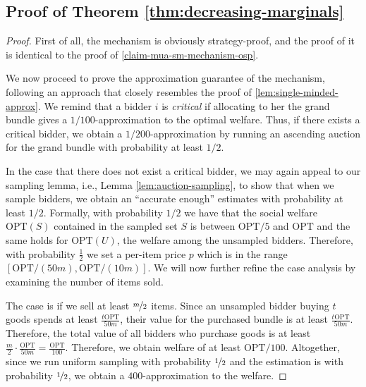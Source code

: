 \subsection{Proof of Theorem \ref{thm:decreasing-marginals}}
\label{subsec::proof--dec-mua}
\begin{proof}
First of all, the mechanism is obviously strategy-proof, and the proof of it is identical to the proof of \cref{claim-mua-sm-mechanism-osp}. 

We now proceed to prove the approximation guarantee of the mechanism, following an approach that closely resembles the proof of \cref{lem:single-minded-approx}. We remind that a bidder $i$ is \emph{critical} if allocating to her the grand bundle
gives a $1/100$-approximation to the optimal welfare. 
Thus, if there exists a critical bidder, we obtain a $1/200$-approximation by running an ascending auction for the grand bundle with probability at least $1/2$.

    In the case that there does not exist a critical bidder, we may again appeal to our sampling lemma, i.e., Lemma \ref{lem:auction-sampling}, to show that when we sample bidders, we obtain an ``accurate enough'' estimates with probability at least $1/2$. Formally, with probability $1/2$ we have that the social welfare $\text{OPT}(S)$ contained in the sampled set $S$ is between $\text{OPT}/5$ and $\text{OPT}$  and the same holds for $\text{OPT}(U)$, the welfare among the unsampled bidders. 
    Therefore, with probability $\frac 1 2 $ we set a per-item price $p$ which is in the range $[\text{OPT}/(50m), \text{OPT}/(10m)]$. We will now further refine the case analysis by examining the number of items sold.
    
    The  case is if we sell at least $\nicefrac m 2$ items. 
      Since an unsampled bidder buying $t$ goods spends at least $\frac{t\text{OPT}}{50m}$, their value for the purchased bundle is at least $\frac{t\text{OPT}}{50m}$. Therefore, the total value of all bidders who purchase goods is at least $\frac{m}{2}\cdot\frac{\text{OPT}}{50m} = \frac{\text{OPT}}{100}$. Therefore,  we  obtain welfare of at least $\text{OPT}/100$. Altogether, since we run uniform sampling with probability $\nicefrac{1}{2}$ and the estimation is
 with probability $\nicefrac{1}{2}$, we obtain  a $400$-approximation to the welfare.
    


\end{proof}
